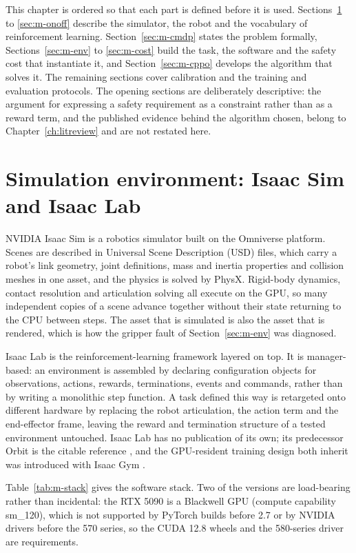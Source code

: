 This chapter is ordered so that each part is defined before it is used. Sections~\ref{sec:m-isaac}
to \ref{sec:m-onoff} describe the simulator, the robot and the vocabulary of reinforcement learning.
Section~\ref{sec:m-cmdp} states the problem formally, Sections~\ref{sec:m-env} to \ref{sec:m-cost}
build the task, the software and the safety cost that instantiate it, and
Section~\ref{sec:m-cppo} develops the algorithm that solves it. The remaining sections cover
calibration and the training and evaluation protocols. The opening sections are deliberately
descriptive: the argument for expressing a safety requirement as a constraint rather than as a
reward term, and the published evidence behind the algorithm chosen, belong to
Chapter~\ref{ch:litreview} and are not restated here.

\section{Simulation environment: Isaac Sim and Isaac Lab}\label{sec:m-isaac}

NVIDIA Isaac Sim is a robotics simulator built on the Omniverse platform. Scenes are described in
Universal Scene Description (USD) files, which carry a robot's link geometry, joint definitions,
mass and inertia properties and collision meshes in one asset, and the physics is solved by PhysX.
Rigid-body dynamics, contact resolution and articulation solving all execute on the GPU, so many
independent copies of a scene advance together without their state returning to the CPU between
steps. The asset that is simulated is also the asset that is rendered, which is how the gripper
fault of Section~\ref{sec:m-env} was diagnosed.

Isaac Lab is the reinforcement-learning framework layered on top. It is manager-based: an
environment is assembled by declaring configuration objects for observations, actions, rewards,
terminations, events and commands, rather than by writing a monolithic step function. A task defined
this way is retargeted onto different hardware by replacing the robot articulation, the action term
and the end-effector frame, leaving the reward and termination structure of a tested environment
untouched. Isaac Lab has no publication of its own; its predecessor Orbit is the citable reference
\cite{mittal2023orbit}, and the GPU-resident training design both inherit was introduced with Isaac
Gym \cite{makoviychuk2021isaacgym}.

Table~\ref{tab:m-stack} gives the software stack. Two of the versions are load-bearing rather than
incidental: the RTX 5090 is a Blackwell GPU (compute capability sm\_120), which is not supported by
PyTorch builds before 2.7 or by NVIDIA drivers before the 570 series, so the CUDA 12.8 wheels and
the 580-series driver are requirements.

